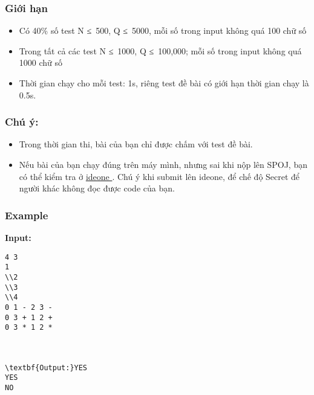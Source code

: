 \subsubsection{   Giới hạn  }
\begin{itemize}
	\item     Có 40\% số test N ≤ 500, Q ≤ 5000, mỗi số trong input không quá 100 chữ số   
	\item     Trong tất cả các test N ≤ 1000, Q ≤ 100,000; mỗi số trong input không quá 1000 chữ số   
	\item     Thời gian chạy cho mỗi test: 1s, riêng test đề bài có giới hạn thời gian chạy là 0.5s.   
\end{itemize}

\subsubsection{   Chú ý:  }
\begin{itemize}
	\item     Trong thời gian thi, bài của bạn chỉ được chấm với test đề bài.   
	\item     Nếu bài của bạn chạy đúng trên máy mình, nhưng sai khi nộp lên SPOJ, bạn có thể kiểm tra ở    \href{https://ideone.com}{     ideone    }    . Chú ý khi submit lên ideone, để chế độ Secret để người khác không đọc được code của bạn.   
\end{itemize}

\subsubsection{   Example  }

\textbf{    Input:   }
\begin{verbatim}
4 3
1
\\2
\\3
\\4
0 1 - 2 3 -
0 3 + 1 2 +
0 3 * 1 2 *



\textbf{Output:}YES
YES
NO\end{verbatim}